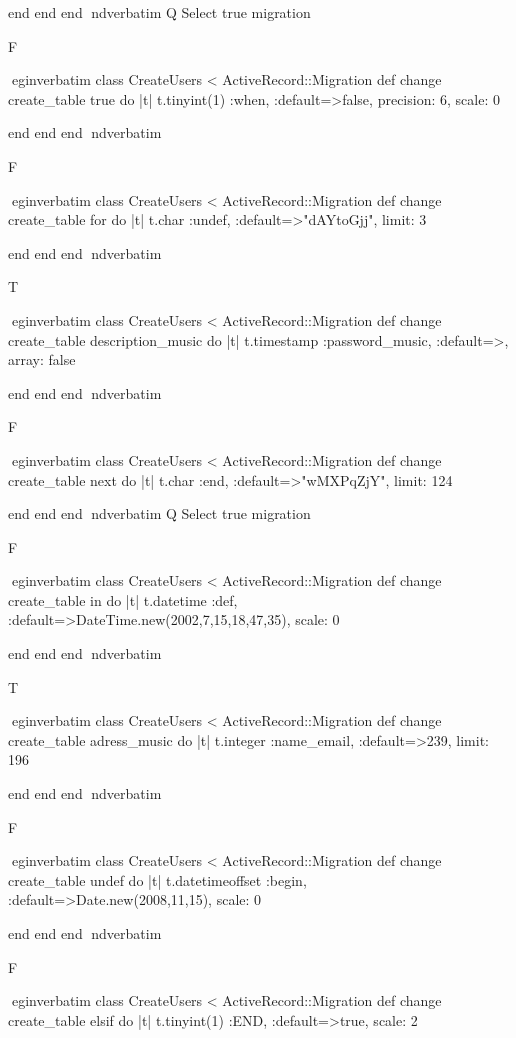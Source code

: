     end 
  end 
end
nd{verbatim}
Q
 Select true migration

F

egin{verbatim}
 class CreateUsers < ActiveRecord::Migration 
  def change 
    create_table true do |t| 
      t.tinyint(1) :when, :default=>false, precision: 6, scale: 0
    
    end 
  end 
end
nd{verbatim}

F

egin{verbatim}
 class CreateUsers < ActiveRecord::Migration 
  def change 
    create_table for do |t| 
      t.char :undef, :default=>"dAYtoGjj", limit: 3
    
    end 
  end 
end
nd{verbatim}

T

egin{verbatim}
 class CreateUsers < ActiveRecord::Migration 
  def change 
    create_table description_music do |t| 
      t.timestamp :password_music, :default=>, array: false
    
    end 
  end 
end
nd{verbatim}

F

egin{verbatim}
 class CreateUsers < ActiveRecord::Migration 
  def change 
    create_table next do |t| 
      t.char :end, :default=>"wMXPqZjY", limit: 124
    
    end 
  end 
end
nd{verbatim}
Q
 Select true migration

F

egin{verbatim}
 class CreateUsers < ActiveRecord::Migration 
  def change 
    create_table in do |t| 
      t.datetime :def, :default=>DateTime.new(2002,7,15,18,47,35), scale: 0
    
    end 
  end 
end
nd{verbatim}

T

egin{verbatim}
 class CreateUsers < ActiveRecord::Migration 
  def change 
    create_table adress_music do |t| 
      t.integer :name_email, :default=>239, limit: 196
    
    end 
  end 
end
nd{verbatim}

F

egin{verbatim}
 class CreateUsers < ActiveRecord::Migration 
  def change 
    create_table undef do |t| 
      t.datetimeoffset :begin, :default=>Date.new(2008,11,15), scale: 0
    
    end 
  end 
end
nd{verbatim}

F

egin{verbatim}
 class CreateUsers < ActiveRecord::Migration 
  def change 
    create_table elsif do |t| 
      t.tinyint(1) :END, :default=>true, scale: 2
    
